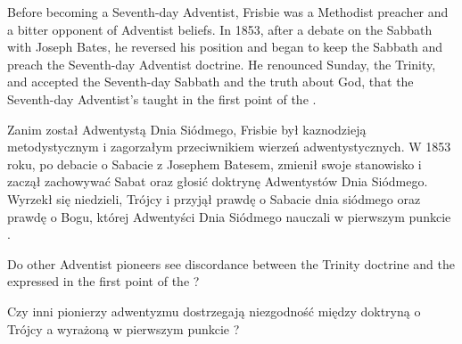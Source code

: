 Before becoming a Seventh-day Adventist, Frisbie was a Methodist preacher and a bitter opponent of Adventist beliefs. In 1853, after a debate on the Sabbath with Joseph Bates, he reversed his position and began to keep the Sabbath and preach the Seventh-day Adventist doctrine. He renounced Sunday, the Trinity, and accepted the Seventh-day Sabbath and the truth about God, that the Seventh-day Adventist’s taught in the first point of the .


Zanim został Adwentystą Dnia Siódmego, Frisbie był kaznodzieją metodystycznym i zagorzałym przeciwnikiem wierzeń adwentystycznych. W 1853 roku, po debacie o Sabacie z Josephem Batesem, zmienił swoje stanowisko i zaczął zachowywać Sabat oraz głosić doktrynę Adwentystów Dnia Siódmego. Wyrzekł się niedzieli, Trójcy i przyjął prawdę o Sabacie dnia siódmego oraz prawdę o Bogu, której Adwentyści Dnia Siódmego nauczali w pierwszym punkcie .


Do other Adventist pioneers see discordance between the Trinity doctrine and the  expressed in the first point of the ?


Czy inni pionierzy adwentyzmu dostrzegają niezgodność między doktryną o Trójcy a  wyrażoną w pierwszym punkcie ?
